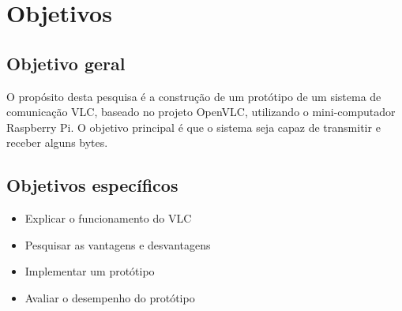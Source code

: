 \chapter{Objetivos}
\section{Objetivo geral}

O propósito desta pesquisa é a construção de um protótipo de um sistema de comunicação VLC, baseado no projeto OpenVLC, utilizando o mini-computador Raspberry Pi. O objetivo principal é que o sistema seja capaz de transmitir e receber alguns bytes.

\section{Objetivos específicos}

\begin{itemize}

  \item Explicar o funcionamento do VLC
  \item Pesquisar as vantagens e desvantagens
  \item Implementar um protótipo
  \item Avaliar o desempenho do protótipo

\end{itemize}

